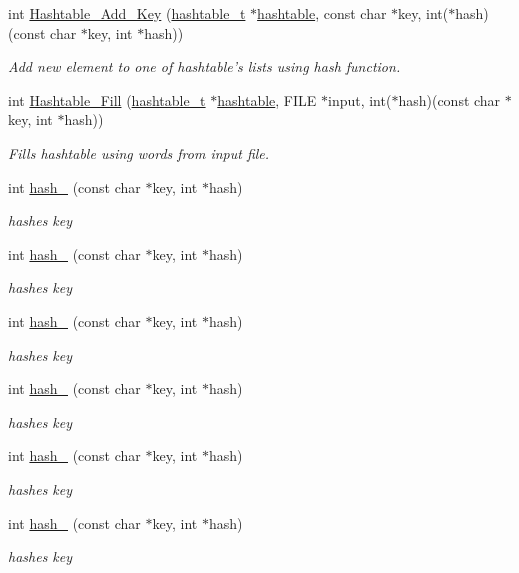 \begin{DoxyCompactItemize}
\item 
int \hyperlink{group__hash_ga5e0fa3c7b9b8ba7b3dcfefccf07a1434}{Hashtable\-\_\-\-Add\-\_\-\-Key} (\hyperlink{structhashtable}{hashtable\-\_\-t} $\ast$\hyperlink{structhashtable}{hashtable}, const char $\ast$key, int($\ast$hash)(const char $\ast$key, int $\ast$hash))
\begin{DoxyCompactList}\small\item\em Add new element to one of hashtable's lists using hash function. \end{DoxyCompactList}\item 
int \hyperlink{group__hash_ga1ae85ee59f675e249267850f117bb62e}{Hashtable\-\_\-\-Fill} (\hyperlink{structhashtable}{hashtable\-\_\-t} $\ast$\hyperlink{structhashtable}{hashtable}, F\-I\-L\-E $\ast$input, int($\ast$hash)(const char $\ast$key, int $\ast$hash))
\begin{DoxyCompactList}\small\item\em Fills hashtable using words from input file. \end{DoxyCompactList}\item 
int \hyperlink{group__hash_gae22d7ca59e18ed64f1965727322a8b1d}{hash\-\_} (const char $\ast$key, int $\ast$hash)
\begin{DoxyCompactList}\small\item\em hashes key \end{DoxyCompactList}\item 
int \hyperlink{group__hash_ga50efdf504c9ddd4a6b9967cecd35e930}{hash\-\_} (const char $\ast$key, int $\ast$hash)
\begin{DoxyCompactList}\small\item\em hashes key \end{DoxyCompactList}\item 
int \hyperlink{group__hash_ga8d3badbedaa080eca63bbdc3e7e53351}{hash\-\_} (const char $\ast$key, int $\ast$hash)
\begin{DoxyCompactList}\small\item\em hashes key \end{DoxyCompactList}\item 
int \hyperlink{group__hash_ga80eec9e1e43d467ef356df6d28a949a1}{hash\-\_} (const char $\ast$key, int $\ast$hash)
\begin{DoxyCompactList}\small\item\em hashes key \end{DoxyCompactList}\item 
int \hyperlink{group__hash_ga5544c3b5dcfe52e427a9df98d7524d41}{hash\-\_} (const char $\ast$key, int $\ast$hash)
\begin{DoxyCompactList}\small\item\em hashes key \end{DoxyCompactList}\item 
int \hyperlink{group__hash_gae1e43eb3a2f9acfdfbfd951c9a879e2e}{hash\-\_} (const char $\ast$key, int $\ast$hash)
\begin{DoxyCompactList}\small\item\em hashes key \end{DoxyCompactList}\end{DoxyCompactItemize}


